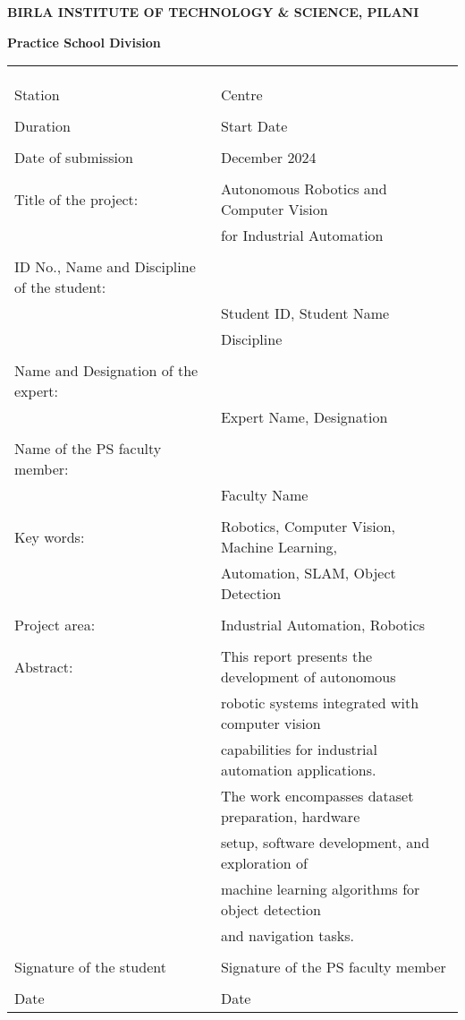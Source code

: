 \documentclass{book}
\begin{document}
	\centerline{\bf BIRLA INSTITUTE OF TECHNOLOGY \& SCIENCE, PILANI}
	\vspace*{0.2cm}
	\centerline{\bf Practice School Division}
	\vspace*{0.3cm}
	{\bf 
		\begin{tabular}{p{6cm}l}
			& \\
			& \\
			& \\
			Station & \hspace*{3cm} Centre \\
			& \\
			Duration &\hspace*{3cm} Start Date \\
			& \\
			Date of submission & December 2024 \\
			& \\
			Title of the project: & Autonomous Robotics and Computer Vision \\
			& for Industrial Automation \\
			& \\
			ID No., Name and Discipline of the student: & \\
			& Student ID, Student Name \\
			& Discipline \\
			& \\
			Name and Designation of the expert: & \\
			& Expert Name, Designation \\
			& \\
			Name of the PS faculty member: & \\
			& Faculty Name \\
			& \\
			Key words: & Robotics, Computer Vision, Machine Learning, \\
			& Automation, SLAM, Object Detection \\
			& \\
			Project area:  & Industrial Automation, Robotics \\
			& \\
			Abstract: & This report presents the development of autonomous \\
			& robotic systems integrated with computer vision \\
			& capabilities for industrial automation applications. \\
			& The work encompasses dataset preparation, hardware \\
			& setup, software development, and exploration of \\
			& machine learning algorithms for object detection \\
			& and navigation tasks. \\
			& \\
			Signature of the student & \hspace*{1cm}Signature of the PS faculty member \\
			& \\
			Date & \hspace*{1cm}Date \\
		\end{tabular}}
\end{document}

